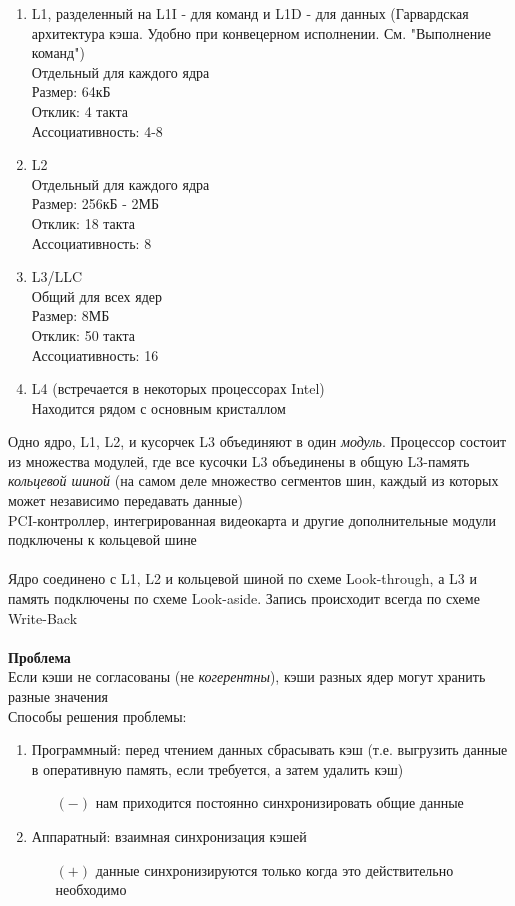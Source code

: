 \documentclass[12pt]{article}
\begin{document}
\begin{enumerate}
    \item L1, разделенный на L1I - для команд и L1D - для данных (Гарвардская архитектура кэша. Удобно при конвецерном исполнении. См. "Выполнение команд")\\
    Отдельный для каждого ядра\\
    Размер: 64кБ\\
    Отклик: 4 такта\\
    Ассоциативность: 4-8
    \item L2\\
    Отдельный для каждого ядра\\
    Размер: 256кБ - 2МБ\\
    Отклик: 18 такта\\
    Ассоциативность: 8
    \item L3/LLC\\
    Общий для всех ядер\\
    Размер: 8МБ\\
    Отклик: 50 такта\\
    Ассоциативность: 16\\
    \item L4 (встречается в некоторых процессорах Intel)\\
    Находится рядом с основным кристаллом
\end{enumerate}
Одно ядро, L1, L2, и кусорчек L3 объединяют в один \textit{модуль}. Процессор состоит из множества модулей, где все кусочки L3 объединены в общую L3-память \textit{кольцевой шиной} (на самом деле множество сегментов шин, каждый из которых может независимо передавать данные)\\
PCI-контроллер, интегрированная видеокарта и другие дополнительные модули подключены к кольцевой шине\\\\
Ядро соединено с L1, L2 и кольцевой шиной по схеме Look-through, а L3 и память подключены по схеме Look-aside. Запись происходит всегда по схеме Write-Back\\\\
\textbf{Проблема}\\
Если кэши не согласованы (не \textit{когерентны}), кэши разных ядер могут хранить разные значения\\
Способы решения проблемы:
\begin{enumerate}
    \item Программный: перед чтением данных сбрасывать кэш (т.е. выгрузить данные в оперативную память, если требуется, а затем удалить кэш)
    \begin{enumerate}
        \item[$(-)$] нам приходится постоянно синхронизировать общие данные
    \end{enumerate}
    \item Аппаратный: взаимная синхронизация кэшей
    \begin{enumerate}
        \item[$(+)$] данные синхронизируются только когда это действительно необходимо
    \end{enumerate}
\end{enumerate}
\end{document}
